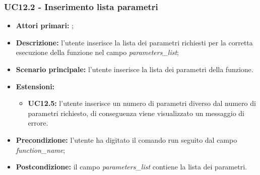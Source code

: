 \subsubsection{UC12.2 - Inserimento lista parametri}
\begin{itemize}
	\item \textbf{Attori primari:} \ua{};
	\item \textbf{Descrizione:} l’utente inserisce la lista dei parametri richiesti per la corretta esecuzione della funzione nel campo \textit{parameters\_list};
	\item \textbf{Scenario principale:}  l'utente inserisce la lista dei parametri della funzione. 
	\item \textbf{Estensioni:} 
	\begin{itemize}
		\item \textbf{UC12.5:}  l’utente inserisce un numero di parametri diverso dal numero di parametri richiesto, di conseguenza viene visualizzato un messaggio di errore.
	\end{itemize}
	\item \textbf{Precondizione:} l’utente ha digitato il comando run seguito dal campo \textit{function\_name};
	\item \textbf{Postcondizione:} il campo \textit{parameters\_list} contiene la lista dei parametri.
\end{itemize}